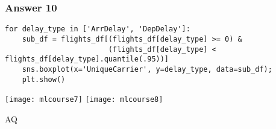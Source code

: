 \begin{frame}[fragile]\frametitle{Answer 10}
\begin{lstlisting}
for delay_type in ['ArrDelay', 'DepDelay']:
    sub_df = flights_df[(flights_df[delay_type] >= 0) &
                        (flights_df[delay_type] < flights_df[delay_type].quantile(.95))]
    sns.boxplot(x='UniqueCarrier', y=delay_type, data=sub_df);
    plt.show()
\end{lstlisting}
\begin{center}
\texttt{[image: mlcourse7]}
\texttt{[image: mlcourse8]}

\end{center}
AQ
\end{frame}